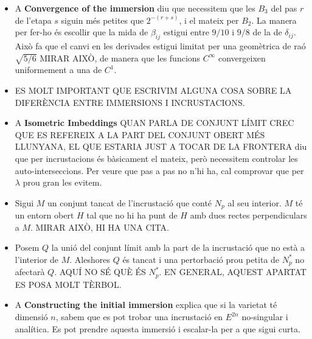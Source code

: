 {\begin{itemize}
        \begin{itemize}
            \item[$\bullet$] El procés es fa en una sèrie d'etapes que prenen una immersió curta $C^\infty$ i en retornen una amb un error mètric com a molt $2/3$ del de l'anterior.
            \item[$\bullet$] La varietat es divideix en entorns $N_p$. 
            \item[$\bullet$] Cada etapa es divideix en passos. A cada etapa, la correcció és pesada per $\varphi_p$ i dividida per tal que la duguin a terme les passes. 
            \item[$\bullet$] Si la varietat és oberta, hi ha un nombre infinit de passos per etapa, però a cada porció compacta hi ha un nombre finit.
        \end{itemize}
    \item A \textbf{Convergence of the immersion} diu que necessitem que les $B_3$ del pas $r$ de l'etapa $s$ siguin més petites que $2^{-(r+s)}$, i el mateix per $B_2$. La manera per fer-ho és escollir que la mida de $\beta_{ij}$ estigui entre $9/10$ i $9/8$ de la de $\delta_{ij}$. Això fa que el canvi en les derivades estigui limitat per una geomètrica de raó $\sqrt{5/6}$ MIRAR AIXÒ, de manera que les funcions $C^\infty$ convergeixen uniformement a una de $C^1$.
    \item ES MOLT IMPORTANT QUE ESCRIVIM ALGUNA COSA SOBRE LA DIFERÈNCIA ENTRE IMMERSIONS I INCRUSTACIONS.
    \item A \textbf{Isometric Imbeddings} {\color{black} QUAN PARLA DE CONJUNT LÍMIT CREC QUE ES REFEREIX A LA PART DEL CONJUNT OBERT MÉS LLUNYANA, EL QUE ESTARIA JUST A TOCAR DE LA FRONTERA} diu que per incrustacions és bàsicament el mateix, però necessitem controlar les auto-interseccions. Per veure que pas a pas no n'hi ha, cal comprovar que per $\lambda$ prou gran les evitem. 
    \item Sigui $M$ un conjunt tancat de l'incrustació que conté $N_p$ al seu interior. $M$ té un entorn obert $H$ tal que no hi ha punt de $H$ amb dues rectes perpendiculars a $M$. MIRAR AIXÒ, HI HA UNA CITA.
    \item Posem $Q$ la unió del conjunt límit amb la part de la incrustació que no està a l'interior de $M$. Aleshores $Q$ és tancat i una pertorbació prou petita de $N_p^*$ no afectarà $Q$. AQUÍ NO SÉ QUÈ ÉS $N_p^*$. EN GENERAL, AQUEST APARTAT ES POSA MOLT TÈRBOL. 
    \item A \textbf{Constructing the initial immersion} explica que si la varietat té dimensió $n$, sabem que es pot trobar una incrustació en $E^{2n}$ no-singular i analítica. Es pot prendre aquesta immersió i escalar-la per a que sigui curta. 

\end{itemize}}
